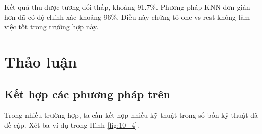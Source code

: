 Kết quả thu được tương đối thấp, khoảng 91.7\%. Phương pháp KNN đơn giản hơn đã
có độ chính xác khoảng 96\%. Điều này chứng tỏ one-vs-rest không làm việc tốt
trong trường hợp này.
 
 
 
 
\section{Thảo luận }
 
\subsection{Kết hợp các phương pháp trên}

 
Trong nhiều trường hợp, ta cần kết hợp nhiều kỹ thuật trong số bốn kỹ thuật đã
đề cập. Xét ba ví dụ trong Hình \ref{fig:10_4}.
 
